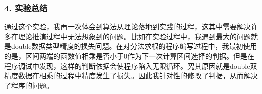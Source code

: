 \documentclass[
]{article}
\begin{document}
\hypertarget{4-ux5b9eux9a8cux603bux7ed3}{%
\subsubsection{4. 实验总结}\label{4-ux5b9eux9a8cux603bux7ed3}}

通过这个实验，我再一次体会到算法从理论落地到实践的过程，这其中需要解决许多在理论推演过程中无法想象到的问题。比如在实验过程中，我遇到最大的问题就是double数据类型精度的损失问题。在对分法求根的程序编写过程中，我最初使用的是，区间两端的函数值相乘是否小于0作为下一次计算区间选择的判据。但是在程序调试中发现，这样的判断依据会使程序陷入无限循环。究其原因就是double双精度数据在相乘的过程中精度发生了损失。因此我针对性的修改了判据，从而解决了程序的问题。
\end{document}
